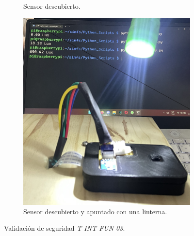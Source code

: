 \begin{figure}[H]
\begin{subfigure}{0.33\textwidth}
        \caption{Sensor descubierto.}
	\end{subfigure}\hfill
    \begin{subfigure}{0.33\textwidth}
    	\centering
        \includegraphics[width=\linewidth]{ImagenesValidacion del prototipo/TINTFUN3c}
        \caption{Sensor descubierto y apuntado con una linterna.}
	\end{subfigure}
	\caption{Validación de seguridad \textit{T-INT-FUN-03}.}
\end{figure}

